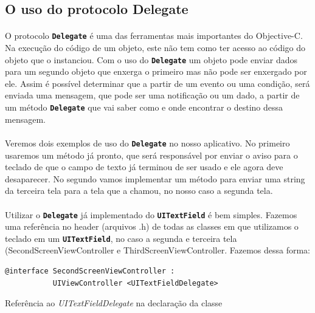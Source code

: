 \documentclass[a4paper,12pt,brazil,doubleside]{book}
\begin{document}
\begin{singlespace}
\bigskip

\subsection{O uso do protocolo Delegate}

\paragraph{}O protocolo \texttt{\textbf{Delegate}} é uma das ferramentas mais importantes do Objective-C. Na execução do código de um objeto, este não tem como ter acesso ao código do objeto que o instanciou. Com o uso do \texttt{\textbf{Delegate}} um objeto pode enviar dados para um segundo objeto que enxerga o primeiro mas não pode ser enxergado por ele. Assim é possível determinar que a partir de um evento ou uma condição, será enviada uma mensagem, que pode ser uma notificação ou um dado, a partir de um método \texttt{\textbf{Delegate}} que vai saber como e onde encontrar o destino dessa mensagem.
\paragraph{}Veremos dois exemplos de uso do \texttt{\textbf{Delegate}} no nosso aplicativo. No primeiro usaremos um método já pronto, que será responsável por enviar o aviso para o teclado de que o campo de texto já terminou de ser usado e ele agora deve desaparecer. No segundo vamos implementar um método para enviar uma string da terceira tela para a tela que a chamou, no nosso caso a segunda tela.
\paragraph{}Utilizar o \texttt{\textbf{Delegate}} já implementado do \texttt{\textbf{UITextField}} é bem simples. Fazemos uma referência no header (arquivos .h) de todas as classes em que utilizamos o teclado em um \texttt{\textbf{UITextField}}, no caso a segunda e terceira tela (SecondScreenViewController e ThirdScreenViewController. Fazemos dessa forma:

\begin{listing}[H]
\begin{verbatim}
@interface SecondScreenViewController :
           UIViewController <UITextFieldDelegate>
\end{verbatim}
\caption{Referência ao \emph{UITextFieldDelegate} na declaração da classe}
\end{listing}


\end{singlespace}
\end{document}
